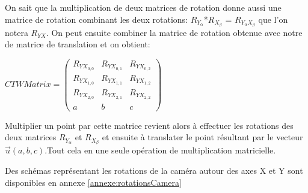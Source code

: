 \documentclass[../../Rapport RayTracer]{subfiles}
\begin{document}
On sait que la multiplication de deux matrices de rotation donne aussi une matrice de rotation combinant les deux rotations: $R_{Y_{\alpha}}$*$R_{X_{\beta}}$ = $R_{Y_{\alpha}X_{\beta}}$ que l'on notera $R_{YX}$. On peut ensuite combiner la matrice de rotation obtenue avec notre de matrice de translation et on obtient:
\begin{center}
	$CTWMatrix =
	\begin{pmatrix}
		R_{YX_{0, 0}} & R_{YX_{0, 1}}  & R_{YX_{0, 2}}\\
		R_{YX_{1, 0}} & R_{YX_{1, 1}}  & R_{YX_{1, 2}}\\
		R_{YX_{2, 0}} & R_{YX_{2, 1}}  & R_{YX_{2, 2}}\\
		a & b & c
	\end{pmatrix}
	$
\end{center}

Multiplier un point par cette matrice revient alors à effectuer les rotations des deux matrices $R_{Y_{\alpha}}$ et $R_{X_{\beta}}$ et ensuite à translater le point résultant par le vecteur $\overrightarrow{u}(a, b, c)$.Tout cela en une seule opération de multiplication matricielle.

Des schémas représentant les rotations de la caméra autour des axes X et Y sont disponibles en annexe \ref{annexe:rotationsCamera}
\end{document}
